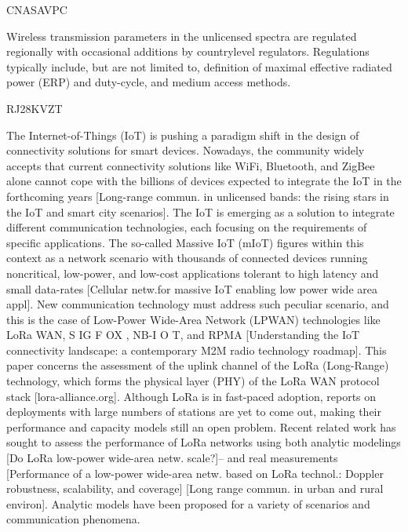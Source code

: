 \cite{hauser_proposal_2017} CNASAVPC

Wireless transmission parameters in the unlicensed spectra are regulated regionally with occasional additions by countrylevel regulators.
Regulations typically include,
	but are not limited to,
	definition of maximal effective radiated power (ERP) and duty-cycle,
	and medium access methods.





\cite{hoeller_exploiting_2018} RJ28KVZT

The Internet-of-Things (IoT) is pushing a paradigm shift in the design of connectivity solutions for smart devices.
Nowadays,
	the community widely accepts that current connectivity solutions like WiFi,
	Bluetooth,
	and ZigBee alone cannot cope with the billions of devices expected to integrate the IoT in the forthcoming years [Long-range commun.
in unlicensed bands:
	the rising stars in the IoT and smart city scenarios].
The IoT is emerging as a solution to integrate different communication technologies,
	each focusing on the requirements of specific applications.
The so-called Massive IoT (mIoT) figures within this context as a network scenario with thousands of connected devices running noncritical,
	low-power,
	and low-cost applications tolerant to high latency and small data-rates [Cellular netw.for massive IoT enabling low power wide area appl].
New communication technology must address such peculiar scenario,
	and this is the case of Low-Power Wide-Area Network (LPWAN) technologies like LoRa WAN,
	S IG F OX ,
	NB-I O T,
	and RPMA [Understanding the IoT connectivity landscape:
	a contemporary M2M radio technology roadmap].
This paper concerns the assessment of the uplink channel of the LoRa (Long-Range) technology,
	which forms the physical layer (PHY) of the LoRa WAN protocol stack [lora-alliance.org].
Although LoRa is in fast-paced adoption,
	reports on deployments with large numbers of stations are yet to come out,
	making their performance and capacity models still an open problem.
Recent related work has sought to assess the performance of LoRa networks using both analytic modelings [Do LoRa low-power wide-area netw.
scale?]–\cite{georgiou_low_2017}\cite{pop_does_2017} and real measurements  [Performance of a low-power wide-area netw.
based on LoRa technol.:
	Doppler robustness,
	scalability,
	and coverage] \cite{wang_performance_2017}
\cite{neumann_indoor_2016}
\cite{angrisani_lora_2017}
\cite{jorke_urban_2017}
[Long range commun.
in urban and rural environ].
Analytic models have been proposed for a variety of scenarios and communication phenomena.

